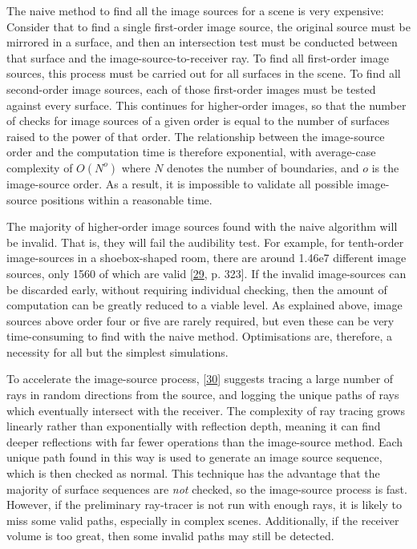 \documentclass[]{scrreprt}
\begin{document}
The naive method to find all the image sources for a scene is very
expensive: Consider that to find a single first-order image source, the
original source must be mirrored in a surface, and then an intersection
test must be conducted between that surface and the
image-source-to-receiver ray. To find all first-order image sources,
this process must be carried out for all surfaces in the scene. To find
all second-order image sources, each of those first-order images must be
tested against every surface. This continues for higher-order images, so
that the number of checks for image sources of a given order is equal to
the number of surfaces raised to the power of that order. The
relationship between the image-source order and the computation time is
therefore exponential, with average-case complexity of \(O(N^o)\) where
\(N\) denotes the number of boundaries, and \(o\) is the image-source
order. As a result, it is impossible to validate all possible
image-source positions within a reasonable time.

The majority of higher-order image sources found with the naive
algorithm will be invalid. That is, they will fail the audibility test.
For example, for tenth-order image-sources in a shoebox-shaped room,
there are around 1.46e7 different image sources, only 1560 of which are
valid {[}\protect\hyperlink{ref-kuttruffux5froomux5f2009}{29}, p.
323{]}. If the invalid image-sources can be discarded early, without
requiring individual checking, then the amount of computation can be
greatly reduced to a viable level. As explained above, image sources
above order four or five are rarely required, but even these can be very
time-consuming to find with the naive method. Optimisations are,
therefore, a necessity for all but the simplest simulations.

To accelerate the image-source process,
{[}\protect\hyperlink{ref-vorlanderux5fauralization:ux5f2007}{30}{]}
suggests tracing a large number of rays in random directions from the
source, and logging the unique paths of rays which eventually intersect
with the receiver. The complexity of ray tracing grows linearly rather
than exponentially with reflection depth, meaning it can find deeper
reflections with far fewer operations than the image-source method. Each
unique path found in this way is used to generate an image source
sequence, which is then checked as normal. This technique has the
advantage that the majority of surface sequences are \emph{not} checked,
so the image-source process is fast. However, if the preliminary
ray-tracer is not run with enough rays, it is likely to miss some valid
paths, especially in complex scenes. Additionally, if the receiver
volume is too great, then some invalid paths may still be detected.
\end{document}
